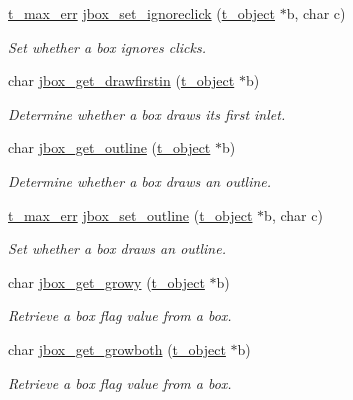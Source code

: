 \begin{DoxyCompactItemize}
\hyperlink{group__datatypes_ga73edaae82b318855cc09fac994918165}{t\_\-max\_\-err} \hyperlink{group__jbox_ga35a6799e184e79e7df4552ed1b75f652}{jbox\_\-set\_\-ignoreclick} (\hyperlink{structt__object}{t\_\-object} $\ast$b, char c)
\begin{DoxyCompactList}\small\item\em Set whether a box ignores clicks. \item\end{DoxyCompactList}\item 
char \hyperlink{group__jbox_gaae56c5cb39f5835b702846e557400522}{jbox\_\-get\_\-drawfirstin} (\hyperlink{structt__object}{t\_\-object} $\ast$b)
\begin{DoxyCompactList}\small\item\em Determine whether a box draws its first inlet. \item\end{DoxyCompactList}\item 
char \hyperlink{group__jbox_ga3316ca865cdfb5d3e64daba573889407}{jbox\_\-get\_\-outline} (\hyperlink{structt__object}{t\_\-object} $\ast$b)
\begin{DoxyCompactList}\small\item\em Determine whether a box draws an outline. \item\end{DoxyCompactList}\item 
\hyperlink{group__datatypes_ga73edaae82b318855cc09fac994918165}{t\_\-max\_\-err} \hyperlink{group__jbox_ga77fc6d8afcf5b91b6b998803a66ca316}{jbox\_\-set\_\-outline} (\hyperlink{structt__object}{t\_\-object} $\ast$b, char c)
\begin{DoxyCompactList}\small\item\em Set whether a box draws an outline. \item\end{DoxyCompactList}\item 
char \hyperlink{group__jbox_ga1c3005aebecc67a41d0abb0f0089a6cb}{jbox\_\-get\_\-growy} (\hyperlink{structt__object}{t\_\-object} $\ast$b)
\begin{DoxyCompactList}\small\item\em Retrieve a box flag value from a box. \item\end{DoxyCompactList}\item 
char \hyperlink{group__jbox_gaecf5b94b11c026032d94d6746d06955f}{jbox\_\-get\_\-growboth} (\hyperlink{structt__object}{t\_\-object} $\ast$b)
\begin{DoxyCompactList}\small\item\em Retrieve a box flag value from a box. \item\end{DoxyCompactList}\item 

\end{DoxyCompactItemize}
